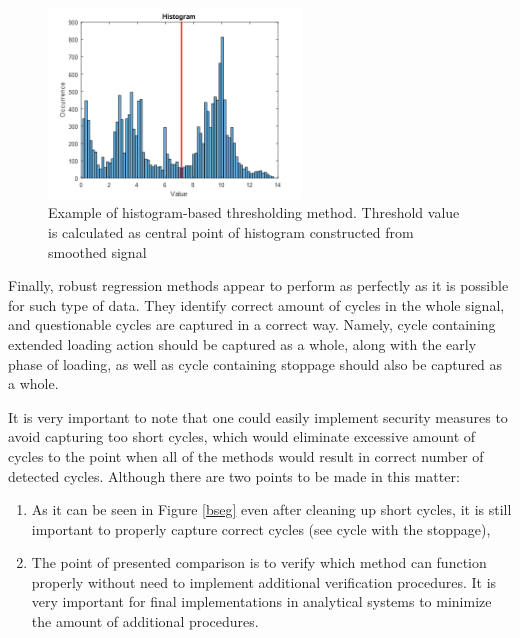 \documentclass{webofc}
\begin{document}
\begin{figure}[ht!]
\centering
\includegraphics[width=0.6\textwidth,clip]{hist}
\caption{Example of histogram-based thresholding method. Threshold value is calculated as central point of histogram constructed from smoothed signal}
\label{hist}       %
\vspace*{-0.8cm}
\end{figure}

Finally, robust regression methods appear to perform as perfectly as it is possible for such type of data. They identify correct amount of cycles in the whole signal, and questionable cycles are captured in a correct way. Namely, cycle containing extended loading action should be captured as a whole, along with the early phase of loading, as well as cycle containing stoppage should also be captured as a whole.

It is very important to note that one could easily implement security measures to avoid capturing too short cycles, which would eliminate excessive amount of cycles to the point when all of the methods would result in correct number of detected cycles. Although there are two points to be made in this matter:

\begin{enumerate}
    \item As it can be seen in Figure \ref{bseg} even after cleaning up short cycles, it is still important to properly capture correct cycles (see cycle with the stoppage),
    \item The point of presented comparison is to verify which method can function properly without need to implement additional verification procedures. It is very important for final implementations in analytical systems to minimize the amount of additional procedures.
\end{enumerate}
\end{document}
